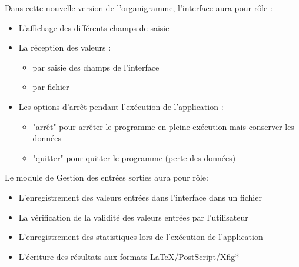 \documentclass[a4paper,11pt]{article}
\begin{document}
		Dans cette nouvelle version de l’organigramme, l’interface aura pour rôle :
		\begin{itemize}
			\item L’affichage des différents champs de saisie
			\item La réception des valeurs :
			\begin{itemize}
				\item par saisie des champs de l’interface
				\item par fichier
			\end{itemize}
			\item Les options d’arrêt pendant l'exécution de l’application :
			\begin{itemize}
				\item "arrêt" pour arrêter le programme en pleine exécution mais conserver les données
				\item "quitter" pour quitter le programme (perte des données)\\
			\end{itemize}
		\end{itemize}
		Le module de Gestion des entrées sorties aura pour rôle:
		\begin{itemize}
			\item L’enregistrement des valeurs entrées dans l’interface dans un fichier
			\item La vérification de la validité des valeurs entrées par l’utilisateur
			\item L’enregistrement des statistiques lors de l'exécution de l'application
			\item L'écriture des résultats aux formats LaTeX/PostScript/Xfig*\\
		\end{itemize}
\end{document}
